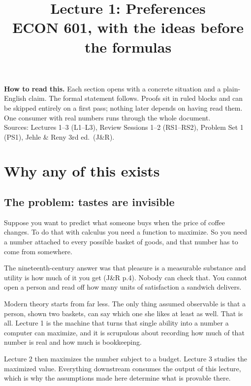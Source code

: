 \documentclass[11pt,letterpaper]{article}
\title{\vspace{-2.2em}\textbf{Lecture 1: Preferences}\\[0.3em]
\large ECON 601, with the ideas before the formulas}
\author{}
\date{}
\theoremstyle{definition}
\theoremstyle{plain}
\newcommand{\src}[1]{{\small\textsf{(#1)}}}
\begin{document}
\maketitle
\vspace{-3em}
\begin{center}
\small \textbf{How to read this.} Each section opens with a concrete situation and a plain-English
claim. The formal statement follows. Proofs sit in ruled blocks and can be skipped entirely on a
first pass; nothing later depends on having read them. One consumer with real numbers runs through
the whole document.\\[0.4em]
Sources: Lectures 1--3 (L1--L3), Review Sessions 1--2 (RS1--RS2), Problem Set 1 (PS1),
Jehle \& Reny 3rd ed.\ (J\&R).
\end{center}
\vspace{0.8em}

{\small\tableofcontents}
\vspace{1em}

\section{Why any of this exists}

\subsection{The problem: tastes are invisible}

Suppose you want to predict what someone buys when the price of coffee changes. To do that with
calculus you need a function to maximize. So you need a number attached to every possible basket of
goods, and that number has to come from somewhere.

The nineteenth-century answer was that pleasure is a measurable substance and utility is how much of
it you get \src{J\&R p.4}. Nobody can check that. You cannot open a person and read off how many
units of satisfaction a sandwich delivers.

Modern theory starts from far less. The only thing assumed observable is that a person, shown two
baskets, can say which one she likes at least as well. That is all. Lecture 1 is the machine that
turns that single ability into a number a computer can maximize, and it is scrupulous about
recording how much of that number is real and how much is bookkeeping.

Lecture 2 then maximizes the number subject to a budget. Lecture 3 studies the maximized value.
Everything downstream consumes the output of this lecture, which is why the assumptions made here
determine what is provable there.
\end{document}
